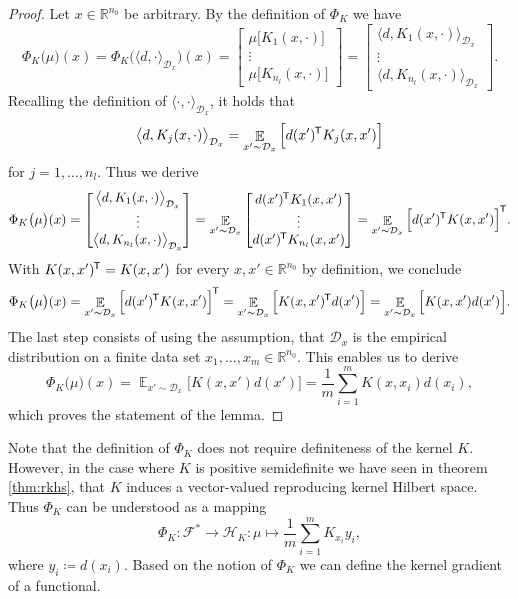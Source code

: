 \documentclass[11pt, a4paper]{article}
\newcommand{\R}{\mathbb{R}}
\newcommand{\D}{\mathcal{D}}
\newcommand{\F}{\mathcal{F}}
\renewcommand{\H}{\mathcal{H}}
\newcommand*{\tr}{^{\mkern-1.5mu\mathsf{T}}}
\DeclareMathOperator*{\E}{\mathbb{E}}
\begin{document}
\begin{proof}
Let $x \in \R^{n_0}$ be arbitrary. By the definition of $\Phi_K$ we have
\[ \Phi_K \big ( \mu \big )(x) = \Phi_K \Big ( \langle d, \cdot \rangle_{\D_x} \Big )(x) = \begin{bmatrix} \mu \big [K_1(x,\cdot) \big ] \\ \vdots \\ \mu \big [ K_{n_l}(x,\cdot) \big ] \end{bmatrix} = \begin{bmatrix} \big \langle d, K_1(x,\cdot) \big \rangle_{\D_x} \\ \vdots \\ \big \langle d, K_{n_l}(x,\cdot) \big \rangle_{\D_x} \end{bmatrix}. \]
Recalling the definition of $\langle \cdot , \cdot \rangle_{\D_x}$, it holds that
\[ \big \langle d, K_j(x,\cdot) \big \rangle_{\D_x} = \E_{x' \sim \D_x} \Big [ d(x')\tr K_j(x,x') \Big ] \]
for $j = 1, \dots, n_l$. Thus we derive
\[ \Phi_K \big ( \mu \big )(x) = \begin{bmatrix} \big \langle d, K_1(x,\cdot) \big \rangle_{\D_x} \\ \vdots \\ \big \langle d, K_{n_l}(x,\cdot) \big \rangle_{\D_x} \end{bmatrix} = \E_{x' \sim \D_x} \begin{bmatrix} d(x')\tr K_{1}(x,x') \\ \vdots \\ d(x')\tr K_{n_l}(x,x') \end{bmatrix} = \E_{x' \sim \D_x} \Big [ d(x')\tr  K(x,x') \Big ]\tr . \]
With $K(x,x')\tr  = K(x,x')$ for every $x,x' \in \R^{n_0}$ by definition, we conclude
\[ \Phi_K \big ( \mu \big )(x) = \E_{x' \sim \D_x} \Big [ d(x')\tr  K(x,x') \Big ]\tr  = \E_{x' \sim \D_x} \Big [ K(x,x')\tr d(x') \Big ] = \E_{x' \sim \D_x} \Big [ K(x,x')d(x') \Big ]. \]
The last step consists of using the assumption, that $\D_x$ is the empirical distribution on a finite data set $x_1, \dots, x_m \in \R^{n_0}$. This enables us to derive
\[ \Phi_K \big ( \mu \big )(x) = \E_{x' \sim \D_x} \Big [ K(x,x')d(x') \Big ] = \frac{1}{m}\sum_{i=1}^{m} K(x,x_i)d(x_i), \]
which proves the statement of the lemma.
\end{proof}

Note that the definition of $\Phi_K$ does not require definiteness of the kernel $K$. However, in the case where $K$ is positive semidefinite we have seen in theorem \ref{thm:rkhs}, that $K$ induces a vector-valued reproducing kernel Hilbert space. Thus $\Phi_K$ can be understood as a mapping
\[ \Phi_K: \F^* \to \H_K : \mu \mapsto \frac{1}{m} \sum_{i=1}^{m} K_{x_i}y_i, \]
where $y_i \coloneq d(x_i)$. Based on the notion of $\Phi_K$ we can define the kernel gradient of a functional.
\end{document}
